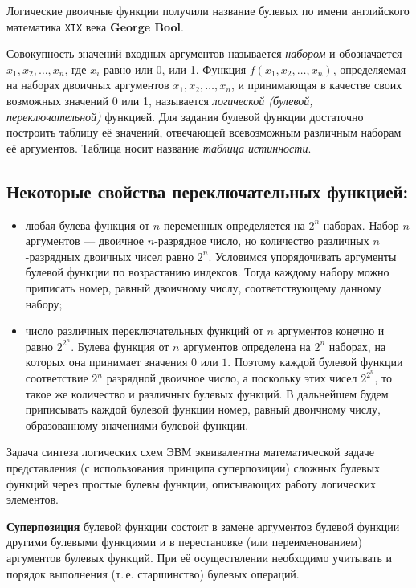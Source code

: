 \documentclass[10pt,a4paper,titlepage]{article}
\begin{document}
Логические двоичные функции получили название булевых по имени английского математика \texttt{XIX} века \textbf{George Bool}.

Совокупность значений входных аргументов называется \textit{набором} и обозначается $x_1, x_2, \dots, x_n$, где $x_i$ равно или 0, или 1.
Функция $f(x_1, x_2, \dots, x_n)$, определяемая на наборах двоичных аргументов $x_1, x_2, \dots, x_n$, и принимающая в качестве своих возможных значений 0 или 1, называется \textit{логической (булевой, переключательной)} функцией.
Для задания булевой функции достаточно построить таблицу её значений, отвечающей всевозможным различным наборам её аргументов.
Таблица носит название \textit{таблица истинности}.

\subsection{Некоторые свойства переключательных функцией:}
\begin{itemize}
\item любая булева функция от $n$ переменных определяется на $2^n$ наборах.
Набор $n$ аргументов --- двоичное $n$-разрядное число, но количество различных $n$-разрядных двоичных чисел равно $2^n$.
Условимся упорядочивать аргументы булевой функции по возрастанию индексов.
Тогда каждому набору можно приписать номер, равный двоичному числу, соответствующему данному набору;
\item число различных переключательных функций от $n$ аргументов конечно и равно $2^{2^n}$.
Булева функция от $n$ аргументов определена на $2^n$ наборах, на которых она принимает значения $0$ или $1$.
Поэтому каждой булевой функции соответствие $2^n$ разрядной двоичное число, а поскольку этих чисел $2^{2^n}$, то такое же количество и различных булевых функций.
В дальнейшем будем приписывать каждой булевой функции номер, равный двоичному числу, образованному значениями булевой функции.
\end{itemize}

Задача синтеза логических схем ЭВМ эквивалентна математической задаче представления (с использования принципа суперпозиции) сложных булевых функций через простые булевы функции, описывающих работу логических элементов.

\textbf{Суперпозиция} булевой функции состоит в замене аргументов булевой функции другими булевыми функциями и в перестановке (или переименованием) аргументов булевых функций.
При её осуществлении необходимо учитывать и порядок выполнения (т.\,е. старшинство) булевых операций.
\end{document}
